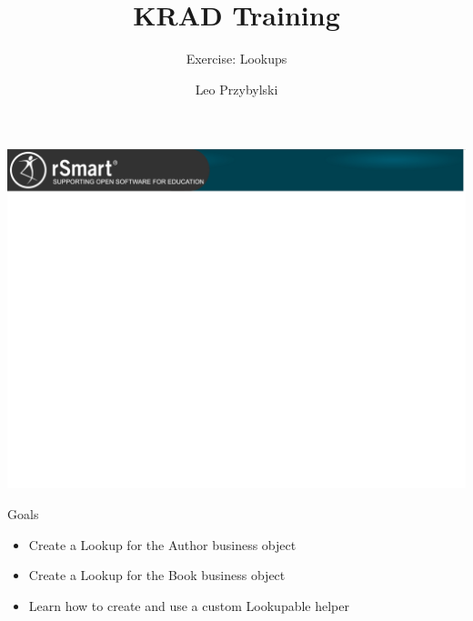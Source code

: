 \documentclass[xcolor=dvipsnames,14pt,professionalfonts]{beamer}
\begin{document}
\title{KRAD Training}
\subtitle{Exercise: Lookups}
\author[Leo]{Leo Przybylski}

\usebackgroundtemplate%
{%
    \includegraphics[width=\paperwidth,height=\paperheight]{../img/header.png}%
}

{
%
\begin{frame}[plain]
  \titlepage
\end{frame}
}

\begin{frame}{Goals}
  \begin{itemize}
    \item Create a Lookup for the Author business object
    \item Create a Lookup for the Book business object
    \item Learn how to create and use a custom Lookupable helper
  \end{itemize}
\end{frame}
\end{document}
